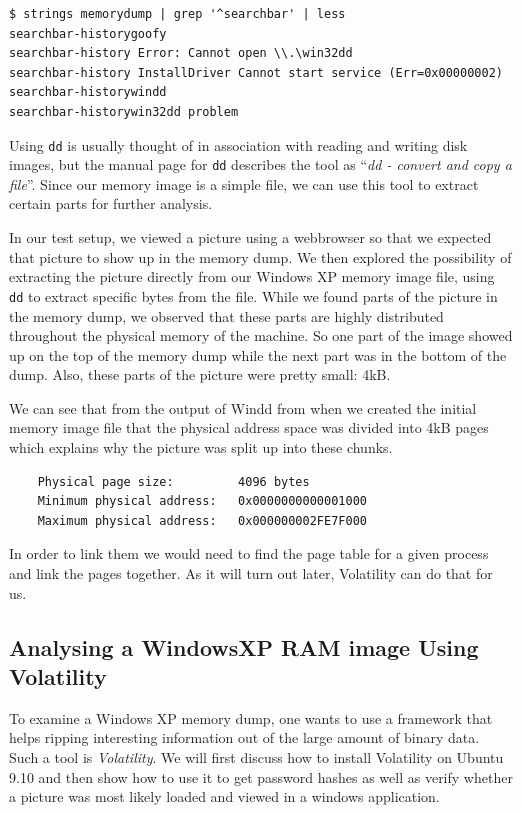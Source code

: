 \documentclass[a4paper,
    11pt,
    normalheadings,
    parindent,
    UKenglish,
    abstracton,
    ]{scrartcl}
\newcommand{\inlinequote}[1]{``\textit{#1}''}
\begin{document}
\begin{verbatim}
$ strings memorydump | grep '^searchbar' | less
searchbar-historygoofy
searchbar-history Error: Cannot open \\.\win32dd
searchbar-history InstallDriver Cannot start service (Err=0x00000002)
searchbar-historywindd
searchbar-historywin32dd problem
\end{verbatim}





Using \texttt{dd} is usually thought of in association with reading and writing disk images, but the manual page for \texttt{dd} describes the tool as \inlinequote{dd - convert and copy a file}.
Since our memory image is a simple file, we can use this tool to extract certain parts for further analysis.

In our test setup, we viewed a picture using a webbrowser so that we expected that picture to show up in the memory dump.
We then explored the possibility of extracting the picture directly from our Windows XP memory image file, using \texttt{dd} to extract specific bytes from the file.
While we found parts of the picture in the memory dump, we observed that these parts are highly distributed throughout the physical memory of the machine.
So one part of the image showed up on the top of the memory dump while the next part was in the bottom of the dump.
Also, these parts of the picture were pretty small: 4kB.

We can see that from the output of Windd from when we created the initial memory image file that the physical address space was divided into 4kB pages which explains why the picture was split up into these chunks.
\begin{verbatim}
    Physical page size:         4096 bytes
    Minimum physical address:   0x0000000000001000
    Maximum physical address:   0x000000002FE7F000
\end{verbatim}

In order to link them we would need to find the page table for a given process and link the pages together.
As it will turn out later, Volatility can do that for us.








\subsection{Analysing a WindowsXP RAM image  Using Volatility}
To examine a Windows XP memory dump, one wants to use a framework that helps ripping interesting information out of the large amount of binary data.
Such a tool is \emph{Volatility}.
We will first discuss how to install Volatility on Ubuntu 9.10 and then show how to use it to get password hashes as well as verify whether a picture was most likely loaded and viewed in a windows application.
\end{document}
